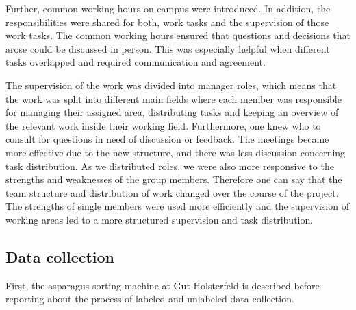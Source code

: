 Further, common working hours on campus were introduced. In addition, the responsibilities were shared for both, work tasks and the supervision of those work tasks. The common working hours ensured that questions and decisions that arose could be discussed in person. This was especially helpful when different tasks overlapped and required communication and agreement.

The supervision of the work was divided into manager roles, which means that the work was split into different main fields where each member was responsible for managing their assigned area, distributing tasks and keeping an overview of the relevant work inside their working field. Furthermore, one knew who to consult for questions  in need of discussion or feedback. The meetings became more effective due to the new structure, and there was less discussion concerning task distribution. As we distributed roles, we were also more responsive to the strengths and weaknesses of the group members. Therefore one can say that the team structure and distribution of work changed over the course of the project. The strengths of single members were used more efficiently and the supervision of working areas led to a more structured supervision and task distribution. 


\subsection{Data collection}
\label{sec:DataCollection}

First, the asparagus sorting machine at Gut Holsterfeld is described before reporting about the process of labeled and unlabeled data collection.

